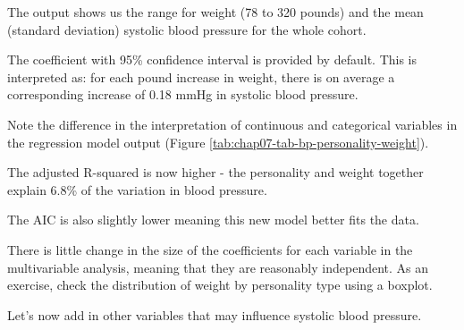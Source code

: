 \documentclass[
  12pt,
  krantz2]{krantz}
\makeatletter
\newenvironment{Shaded}{\begin{snugshade}}{\end{snugshade}}
\newcommand{\DataTypeTok}[1]{\textcolor[rgb]{0.13,0.29,0.53}{#1}}
\newcommand{\KeywordTok}[1]{\textcolor[rgb]{0.13,0.29,0.53}{\textbf{#1}}}
\newcommand{\NormalTok}[1]{#1}
\newcommand{\OperatorTok}[1]{\textcolor[rgb]{0.81,0.36,0.00}{\textbf{#1}}}
\newcommand{\OtherTok}[1]{\textcolor[rgb]{0.56,0.35,0.01}{#1}}
\newcommand{\StringTok}[1]{\textcolor[rgb]{0.31,0.60,0.02}{#1}}
\newenvironment{kframe}{%
\medskip{}
\setlength{\fboxsep}{.8em}
 \def\at@end@of@kframe{}%
 \ifinner\ifhmode%
  \def\at@end@of@kframe{\end{minipage}}%
  \begin{minipage}{\columnwidth}%
 \fi\fi%
 \def\FrameCommand##1{\hskip\@totalleftmargin \hskip-\fboxsep
 \colorbox{shadecolor}{##1}\hskip-\fboxsep
     \hskip-\linewidth \hskip-\@totalleftmargin \hskip\columnwidth}%
 \MakeFramed {\advance\hsize-\width
   \@totalleftmargin\z@ \linewidth\hsize
   \@setminipage}}%
 {\par\unskip\endMakeFramed%
 \at@end@of@kframe}
\renewenvironment{Shaded}{\begin{kframe}}{\end{kframe}}
\makeatother
\begin{document}
\begin{table}[!h]

\caption{\label{tab:chap07-tab-bp-personality-weight}Multivariable linear regression metrics: Systolic blood pressure by personality type and weight.}
\centering
{}
\end{table}

The output shows us the range for weight (78 to 320 pounds) and the mean (standard deviation) systolic blood pressure for the whole cohort.

The coefficient with 95\% confidence interval is provided by default.
This is interpreted as: for each pound increase in weight, there is on average a corresponding increase of 0.18 mmHg in systolic blood pressure.

Note the difference in the interpretation of continuous and categorical variables in the regression model output (Figure \ref{tab:chap07-tab-bp-personality-weight}).

The adjusted R-squared is now higher - the personality and weight together explain 6.8\% of the variation in blood pressure.

The AIC is also slightly lower meaning this new model better fits the data.

There is little change in the size of the coefficients for each variable in the multivariable analysis, meaning that they are reasonably independent.
As an exercise, check the distribution of weight by personality type using a boxplot.

Let's now add in other variables that may influence systolic blood pressure.

\begin{Shaded}
\end{Shaded}
\end{document}

